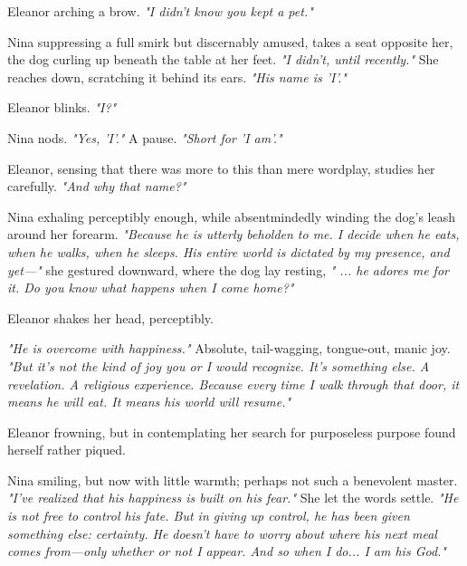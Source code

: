 Eleanor arching a brow. \textit{"I didn't know you kept a pet."}

Nina suppressing a full smirk but discernably amused, takes a seat opposite her, the dog curling up beneath the table at her feet. \textit{"I didn’t, until recently."} She reaches down, scratching it behind its ears. \textit{"His name is 'I'."}

\smallskip

Eleanor blinks. \textit{"I?"}  

\smallskip

Nina nods. \textit{"Yes, 'I'."} A pause. \textit{"Short for 'I am'."}

\smallskip

Eleanor, sensing that there was more to this than mere wordplay, studies her carefully. \textit{"And why that name?"}

\smallskip

Nina exhaling perceptibly enough, while absentmindedly winding the dog’s leash around her forearm. \textit{"Because he is utterly beholden to me. I decide when he eats, when he walks, when he sleeps. His entire world is dictated by my presence, and yet—"} she gestured downward, where the dog lay resting, \textit{" ... he adores me for it. Do you know what happens when I come home?"}

\smallskip

Eleanor shakes her head, perceptibly.

\smallskip

\textit{"He is overcome with happiness."} Absolute, tail-wagging, tongue-out, manic joy. \textit{"But it's not the kind of joy you or I would recognize. It's something else. A revelation. A religious experience. Because every time I walk through that door, it means he will eat. It means his world will resume."}  

Eleanor frowning, but in contemplating her search for purposeless purpose found herself rather piqued.

\smallskip

Nina smiling, but now with little warmth; perhaps not such a benevolent master. \textit{"I've realized that his happiness is built on his fear."} She let the words settle. \textit{"He is not free to control his fate. But in giving up control, he has been given something else: certainty. He doesn’t have to worry about where his next meal comes from—only whether or not I appear. And so when I do... I am his God."}

\smallskip

